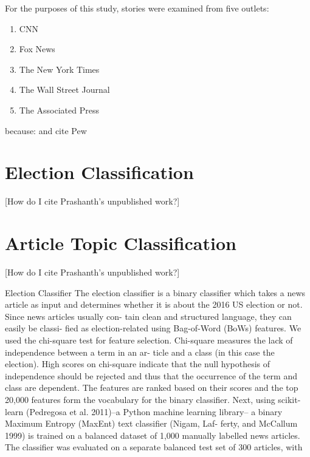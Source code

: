 For the purposes of this study, stories were examined from five outlets: 

\begin{enumerate}
  \item CNN
  \item Fox News  
  \item The New York Times
  \item The Wall Street Journal
  \item The Associated Press 
\end{enumerate}

because:   
and cite Pew

\section{Election Classification}
[How do I cite Prashanth's unpublished work?]

\section{Article Topic Classification}
[How do I cite Prashanth's unpublished work?]
 

Election Classifier
The election classifier is a binary classifier which takes a news article as input and determines whether it is about the 2016 US election or not. Since news articles usually con- tain clean and structured language, they can easily be classi- fied as election-related using Bag-of-Word (BoWs) features. We used the chi-square test for feature selection. Chi-square measures the lack of independence between a term in an ar- ticle and a class (in this case the election). High scores on chi-square indicate that the null hypothesis of independence should be rejected and thus that the occurrence of the term and class are dependent. The features are ranked based on their scores and the top 20,000 features form the vocabulary for the binary classifier. Next, using scikit-learn (Pedregosa et al. 2011)–a Python machine learning library– a binary Maximum Entropy (MaxEnt) text classifier (Nigam, Laf- ferty, and McCallum 1999) is trained on a balanced dataset of 1,000 manually labelled news articles. The classifier was evaluated on a separate balanced test set of 300 articles, with



